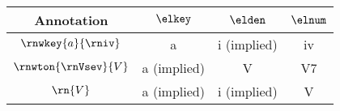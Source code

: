 \begin{tabular}{c|ccc}
Annotation & $\elkey$       & $\elden$       & $\elnum$ \\
\hline 
$\rnwkey{a}{\rniv}$         & a              & i (implied)       & iv       \\
$\rnwton{\rnVsev}{V}$       & a (implied)    & V                 & V7       \\
$\rn{V}$                    & a (implied)    & i (implied)       & V    
\end{tabular}
